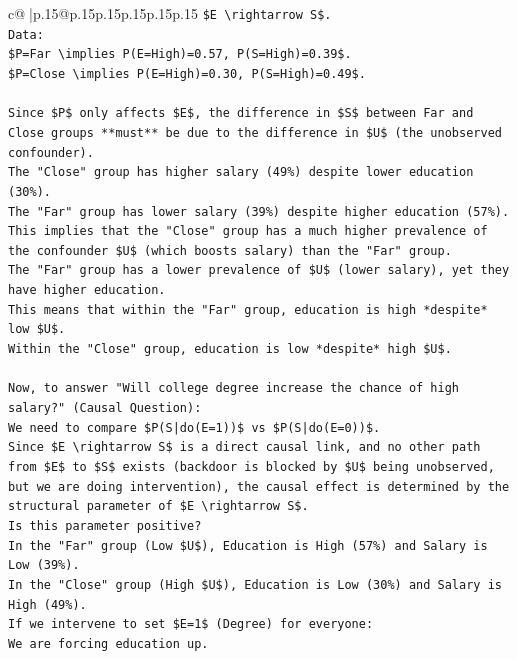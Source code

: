 \documentclass{article}
\begin{document}
{\begin{supertabular}{c@{$\;$}|p{.15\linewidth}@{}p{.15\linewidth}p{.15\linewidth}p{.15\linewidth}p{.15\linewidth}p{.15\linewidth}}
{{{\texttt{\$E \textbackslash{}rightarrow S\$.} \\
\texttt{Data:} \\
\texttt{\$P=Far \textbackslash{}implies P(E=High)=0.57, P(S=High)=0.39\$.} \\
\texttt{\$P=Close \textbackslash{}implies P(E=High)=0.30, P(S=High)=0.49\$.} \\
\\ 
\texttt{Since \$P\$ only affects \$E\$, the difference in \$S\$ between Far and Close groups **must** be due to the difference in \$U\$ (the unobserved confounder).} \\
\texttt{The "Close" group has higher salary (49\%) despite lower education (30\%).} \\
\texttt{The "Far" group has lower salary (39\%) despite higher education (57\%).} \\
\texttt{This implies that the "Close" group has a much higher prevalence of the confounder \$U\$ (which boosts salary) than the "Far" group.} \\
\texttt{The "Far" group has a lower prevalence of \$U\$ (lower salary), yet they have higher education.} \\
\texttt{This means that within the "Far" group, education is high *despite* low \$U\$.} \\
\texttt{Within the "Close" group, education is low *despite* high \$U\$.} \\
\\ 
\texttt{Now, to answer "Will college degree increase the chance of high salary?" (Causal Question):} \\
\texttt{We need to compare \$P(S|do(E=1))\$ vs \$P(S|do(E=0))\$.} \\
\texttt{Since \$E \textbackslash{}rightarrow S\$ is a direct causal link, and no other path from \$E\$ to \$S\$ exists (backdoor is blocked by \$U\$ being unobserved, but we are doing intervention), the causal effect is determined by the structural parameter of \$E \textbackslash{}rightarrow S\$.} \\
\texttt{Is this parameter positive?} \\
\texttt{In the "Far" group (Low \$U\$), Education is High (57\%) and Salary is Low (39\%).} \\
\texttt{In the "Close" group (High \$U\$), Education is Low (30\%) and Salary is High (49\%).} \\
\texttt{If we intervene to set \$E=1\$ (Degree) for everyone:} \\
\texttt{We are forcing education up.} \\
}}}
\end{supertabular}}
\end{document}
